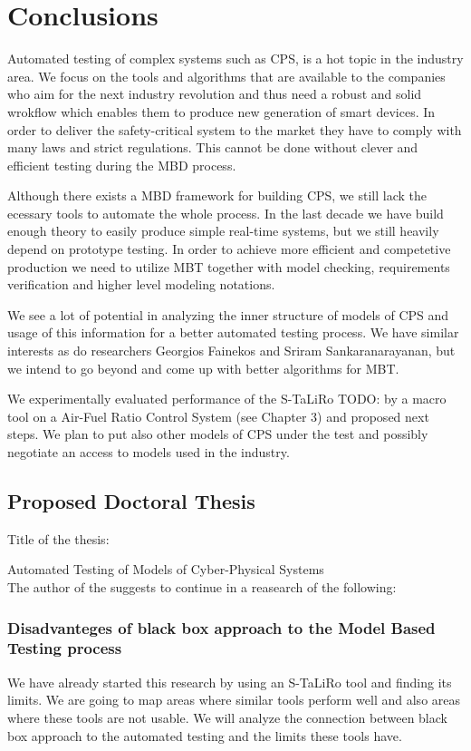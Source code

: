 \chapter{Conclusions}
% 

Automated testing of complex systems such as CPS, is a hot topic in the industry area. We focus on the tools and algorithms that are available to the companies who aim for the next industry revolution and thus need a robust and solid wrokflow which enables them to produce new generation of smart devices. In order to deliver the safety-critical system to the market they have to comply with many laws and strict regulations. This cannot be done without clever and efficient testing during the MBD process.

Although there exists a MBD framework for building CPS, we still lack the ecessary tools to automate the whole process. In the last decade we have build enough theory to easily produce simple real-time systems, but we still heavily depend on prototype testing. In order to achieve more efficient and competetive production we need to utilize MBT together with model checking, requirements verification and higher level modeling notations.

We see a lot of potential in analyzing the inner structure of models of CPS and usage of this information for a better automated testing process. We have similar interests as do researchers Georgios Fainekos and Sriram Sankaranarayanan, but we intend to go beyond and come up with better algorithms for MBT.

We experimentally evaluated performance of the S-TaLiRo TODO: by a macro tool on a Air-Fuel Ratio Control System  (see Chapter 3) and proposed next steps. We plan to put also other models of CPS under the test and possibly negotiate an access to models used in the industry.

\section{Proposed Doctoral Thesis}
Title of the thesis:

Automated Testing of Models of Cyber-Physical Systems
\\
The author of the \thesis{} suggests to continue in a reasearch of the following:
\subsection{Disadvanteges of black box approach to the Model Based Testing process}
We have already started this research by using an S-TaLiRo tool and finding its limits. We are going to map areas where similar tools perform well and also areas where these tools are not usable. We will analyze the connection between black box approach to the automated testing and the limits these tools have.

